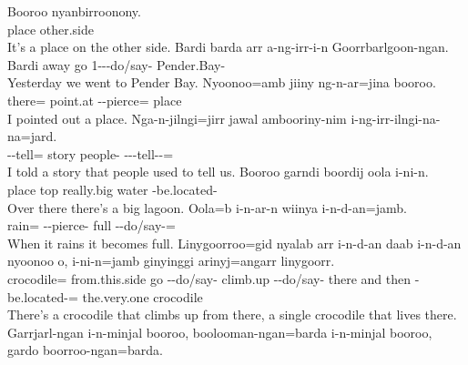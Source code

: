 \setcounter{exxy}{0}\begin{exye}
\exy {}
\gll Booroo nyanbirroonony.\\
place other.side\\
\ft It's a place on the other side.
\exy {}
\gll Bardi barda arr a-ng-irr-i-n Goorrbarlgoon-ngan.\\
Bardi away go 1---do/say- {Pender.Bay}-\\
\ft Yesterday we went to Pender Bay.
\exy {}
\gll Nyoonoo=amb jiiny ng-n-ar=jina booroo.\\
there= point.at --pierce= place\\
\ft I pointed out a place.
\exy {}
\gll Nga-n-jilngi=jirr jawal ambooriny-nim i-ng-irr-ilngi-na-na=jard.\\
--tell= story people- ---tell--=\\
\ft I told a story that people used to tell us.
\exy {}
\gll Booroo garndi boordij oola i-ni-n.\\
place top really.big water -be.located-\\
\ft Over there there's a big lagoon.
\newpage\exy {}
\gll Oola=b i-n-ar-n wiinya i-n-d-an=jamb.\\
rain= --pierce- full --do/say-=\\
\ft When it rains it becomes full.
\exy {}
\gll Linygoorroo=gid nyalab arr i-n-d-an daab i-n-d-an nyoonoo o, i-ni-n=jamb ginyinggi arinyj=angarr linygoorr.\\
crocodile= from.this.side go --do/say- climb.up --do/say- there and then -be.located-=  the.very.one crocodile\\
\ft There's a crocodile that climbs up from there, a single crocodile that lives there.
\exy {}
\gll Garrjarl-ngan i-n-minjal booroo, boolooman-ngan=barda i-n-minjal booroo, gardo boorroo-ngan=barda.\\

\end{exye}
